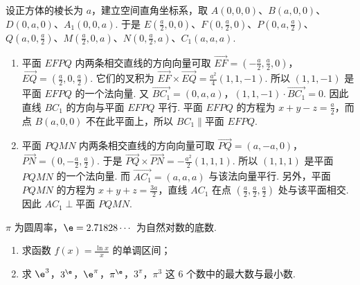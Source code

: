 \begin{solution}
设正方体的棱长为 \(a\)，建立空间直角坐标系，取
\(A(0,0,0)\)、\(B(a,0,0)\)、\(D(0,a,0)\)、\(A_1(0,0,a)\).
于是 \(E\left(\frac{a}{2},0,0\right)\)、\(F\left(0,\frac{a}{2},0\right)\)、\(P\left(0,a,\frac{a}{2}\right)\)、\(Q\left(a,0,\frac{a}{2}\right)\)、\(M\left(\frac{a}{2},0,a\right)\)、\(N\left(0,\frac{a}{2},a\right)\)、\(C_1(a,a,a)\).

\begin{enumerate}
\item 平面 \(EFPQ\) 内两条相交直线的方向向量可取
\(\overrightarrow{EF}=\left(-\frac{a}{2},\frac{a}{2},0\right)\)，\(\overrightarrow{EQ}=\left(\frac{a}{2},0,\frac{a}{2}\right)\).
它们的叉积为 \(\overrightarrow{EF}\times\overrightarrow{EQ}=\frac{a^2}{4}(1,1,-1)\).
所以 \((1,1,-1)\) 是平面 \(EFPQ\) 的一个法向量. 又
\(\overrightarrow{BC_1}=(0,a,a)\)，\((1,1,-1)\cdot\overrightarrow{BC_1}=0\).
因此直线 \(BC_1\) 的方向与平面 \(EFPQ\) 平行. 平面 \(EFPQ\) 的方程为 \(x+y-z=\frac{a}{2}\)，而点 \(B(a,0,0)\) 不在此平面上，所以 \(BC_1\parallel\text{平面 }EFPQ\).

\item 平面 \(PQMN\) 内两条相交直线的方向向量可取
\(\overrightarrow{PQ}=(a,-a,0)\)，\(\overrightarrow{PN}=\left(0,-\frac{a}{2},\frac{a}{2}\right)\).
于是 \(\overrightarrow{PQ}\times\overrightarrow{PN}=-\frac{a^2}{2}(1,1,1)\).
所以 \((1,1,1)\) 是平面 \(PQMN\) 的一个法向量. 而 \(\overrightarrow{AC_1}=(a,a,a)\) 与该法向量平行. 另外，平面 \(PQMN\) 的方程为 \(x+y+z=\frac{3a}{2}\)，直线 \(AC_1\) 在点 \(\left(\frac{a}{2},\frac{a}{2},\frac{a}{2}\right)\) 处与该平面相交. 因此 \(AC_1\perp\text{平面 }PQMN\).
\end{enumerate}
\end{solution}

\begin{problem}
\(\pi\) 为圆周率，\(\e = 2.71828\cdots\) 为自然对数的底数.
\begin{enumerate}
\item 求函数 \( f(x) = \frac{\ln x}{x} \) 的单调区间；
\item 求 \( \e^{3} \)，\( 3^{\e} \)，\( \e^{\pi} \)，\( \pi^{\e} \)，\( 3^{\pi} \)，\( \pi^{3} \) 这 6 个数中的最大数与最小数.
\end{enumerate}
\end{problem}

